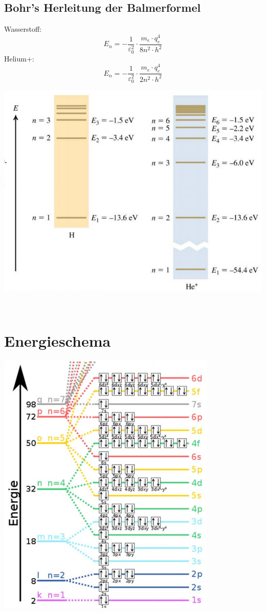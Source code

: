 \subsection{Bohr's Herleitung der Balmerformel}
Wasserstoff:
\[
	E_n= - \frac{1}{\varepsilon_0^2}\cdot\frac{m_e\cdot q_e^4}{8n^2\cdot h^2}
\]
Helium+:
\[
	E_n= - 
	\frac{1}{\varepsilon_0^2}\cdot\frac{m_e\cdot q_e^4}{2n^2\cdot h^2}
\]
\begin{center}
	\includegraphics[scale = 0.25]{../fig/bhor_herleitung.jpg}
\end{center}
\
\\
\section{Energieschema}
\begin{center}
	\includegraphics[scale = 0.3]{../fig/energieschema.jpg}
\end{center}
\
\\
